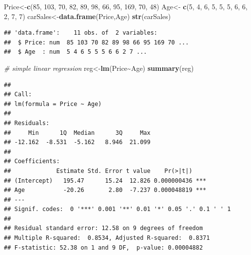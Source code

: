 \documentclass[
]{article}
\newenvironment{Shaded}{\begin{snugshade}}{\end{snugshade}}
\newcommand{\CommentTok}[1]{\textcolor[rgb]{0.56,0.35,0.01}{\textit{#1}}}
\newcommand{\DecValTok}[1]{\textcolor[rgb]{0.00,0.00,0.81}{#1}}
\newcommand{\FunctionTok}[1]{\textcolor[rgb]{0.13,0.29,0.53}{\textbf{#1}}}
\newcommand{\NormalTok}[1]{#1}
\newcommand{\OtherTok}[1]{\textcolor[rgb]{0.56,0.35,0.01}{#1}}
\newcommand{\SpecialCharTok}[1]{\textcolor[rgb]{0.81,0.36,0.00}{\textbf{#1}}}
\begin{document}
\begin{Shaded}
\begin{Highlighting}[]
\NormalTok{Price}\OtherTok{\textless{}{-}}\FunctionTok{c}\NormalTok{(}\DecValTok{85}\NormalTok{, }\DecValTok{103}\NormalTok{,  }\DecValTok{70}\NormalTok{,  }\DecValTok{82}\NormalTok{,  }\DecValTok{89}\NormalTok{,  }\DecValTok{98}\NormalTok{,  }\DecValTok{66}\NormalTok{,  }\DecValTok{95}\NormalTok{, }\DecValTok{169}\NormalTok{,  }\DecValTok{70}\NormalTok{,  }\DecValTok{48}\NormalTok{)}
\NormalTok{Age}\OtherTok{\textless{}{-}} \FunctionTok{c}\NormalTok{(}\DecValTok{5}\NormalTok{, }\DecValTok{4}\NormalTok{, }\DecValTok{6}\NormalTok{, }\DecValTok{5}\NormalTok{, }\DecValTok{5}\NormalTok{, }\DecValTok{5}\NormalTok{, }\DecValTok{6}\NormalTok{, }\DecValTok{6}\NormalTok{, }\DecValTok{2}\NormalTok{, }\DecValTok{7}\NormalTok{, }\DecValTok{7}\NormalTok{)}
\NormalTok{carSales}\OtherTok{\textless{}{-}}\FunctionTok{data.frame}\NormalTok{(Price,Age)}
\FunctionTok{str}\NormalTok{(carSales)}
\end{Highlighting}
\end{Shaded}

\begin{verbatim}
## 'data.frame':    11 obs. of  2 variables:
##  $ Price: num  85 103 70 82 89 98 66 95 169 70 ...
##  $ Age  : num  5 4 6 5 5 5 6 6 2 7 ...
\end{verbatim}

\begin{Shaded}
\begin{Highlighting}[]
\CommentTok{\# simple linear regression}
\NormalTok{reg}\OtherTok{\textless{}{-}}\FunctionTok{lm}\NormalTok{(Price}\SpecialCharTok{\textasciitilde{}}\NormalTok{Age)}
\FunctionTok{summary}\NormalTok{(reg)}
\end{Highlighting}
\end{Shaded}

\begin{verbatim}
## 
## Call:
## lm(formula = Price ~ Age)
## 
## Residuals:
##     Min      1Q  Median      3Q     Max 
## -12.162  -8.531  -5.162   8.946  21.099 
## 
## Coefficients:
##             Estimate Std. Error t value    Pr(>|t|)    
## (Intercept)   195.47      15.24  12.826 0.000000436 ***
## Age           -20.26       2.80  -7.237 0.000048819 ***
## ---
## Signif. codes:  0 '***' 0.001 '**' 0.01 '*' 0.05 '.' 0.1 ' ' 1
## 
## Residual standard error: 12.58 on 9 degrees of freedom
## Multiple R-squared:  0.8534, Adjusted R-squared:  0.8371 
## F-statistic: 52.38 on 1 and 9 DF,  p-value: 0.00004882
\end{verbatim}
\end{document}
